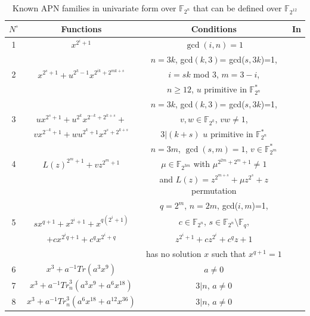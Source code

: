 \documentclass{article}
\begin{document}
\begin{table}[h!]
    \centering
\scriptsize{    \begin{tabular}{|c|c|c|c|}

    \hline
      $N^\circ$&Functions &  Conditions &  In\\
      \hline
      \hline
        1  & $x^{2^i+1}$& $\gcd(i,n)=1$& \cite{86} \\
          \hline
       & & $n=3k$,   gcd$(k,3)$= gcd($s,3k$)=1, & \\
		2& $x^{2^s+1}+u^{2^k-1}x^{2^{ik}+2^{mk+s}}$ &  $i=sk$ mod $3$, $m=3-i$,   & \cite{30} \\
		& & $n\geq12$, $u$ primitive in $\mathbb{F}_{2^n}^*$   & \\
     
        \hline
		& & $n=3k$,  gcd$(k,3)$= gcd($s,3k$)=1,   & \\
		3& $ux^{2^s+1}+u^{2^k}x^{2^{-k}+2^{k+s}}+$ &  $v,w \in \mathbb{F}_{2^k}$, $vw\neq1$,  & \cite{BraBy08,13} \\
		& $vx^{2^{-k}+1}+wu^{2^k+1}x^{2^s+2^{k+s}}$ & $3|(k+s)$ $u$ primitive in $\mathbb{F}_{2^n}^*$   & \\
		\hline
		&&$n=3m$, $\gcd(s,m)=1$, $v\in\mathbb{F}_{2^{m}}^{*}$&\\
	4	&$L(z)^{2^m+1}+vz^{2^m+1}$& $\mu\in\mathbb{F}_{2^{3m}}$ with $\mu^{2^{2m}+2^m+1}\neq1$&\cite{LZLQ}\\
	&&and $ L(z) = z^{2^{m+s}}+\mu z^{2^s}+z$ permutation &\\
		\hline
		   & & $q=2^m$, $n=2m$,  gcd($i,m$)=1,   & \\
	5& $sx^{{q+1}}+x^{2^i+1}+x^{q({2^i+1})}$ & $c\in\mathbb{F}_{2^n}$, $s\in\mathbb{F}_{2^n}\setminus\mathbb{F}_q$, & \cite{BudCar08}\\
		&$+ cx^{2^{i}q+1}+ c^{q}x^{{2^i+q}} $    &$z^{2^i+1}+ c z^{2^i} + c ^{q}z+1$& \\
		& & has no solution $x$ such that $x^{q+1}=1$      & \\
		\hline
		6& $x^3+a^{-1}\textit{Tr}(a^3x^9)$& $a\neq0$ & \cite{BCL09}\\
		\hline
		7& $x^3+a^{-1}\textit{Tr}_n^3(a^3x^9+a^6x^{18})$& $3|n$, $a\neq0$ & \cite{BCL09.2} \\
		\hline
		8& $x^3+a^{-1}\textit{Tr}_n^3(a^6x^{18}+a^{12}x^{36})$& $3|n$, $a\neq0$ & \cite{BCL09.2} \\
		
		\hline
	
	
    \end{tabular}
    \caption{Known APN families in univariate form over $\mathbb{F}_{2^{n}}$ that can be defined over $\mathbb{F}_{2^{12}}$}
    \label{tab:APNfamuni}}
\end{table}
\end{document}
